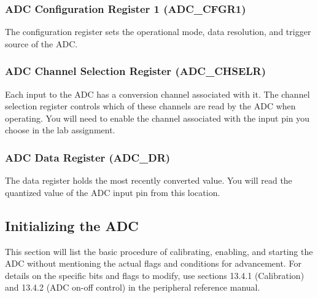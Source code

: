 \documentclass[openany,11pt,fleqn]{book} %
\begin{document}
\subsubsection{ADC Configuration Register 1 (ADC\_CFGR1)}
The configuration register sets the operational mode, data resolution, and trigger source of the ADC. 

\subsubsection{ADC Channel Selection Register (ADC\_CHSELR)}
Each input to the ADC has a conversion channel associated with it. The channel selection register controls which of these channels are read by the ADC when operating. You will need to enable the channel associated with the input pin you choose in the lab assignment. 

\subsubsection{ADC Data Register (ADC\_DR)}
The data register holds the most recently converted value. You will read the quantized value of the ADC input pin from this location. 

\subsection{Initializing the ADC}
This section will list the basic procedure of calibrating, enabling, and starting the ADC without mentioning the actual flags and conditions for advancement. For details on the specific bits and flags to modify, use sections 13.4.1 (Calibration) and 13.4.2 (ADC on-off control) in the peripheral reference manual.
\end{document}
